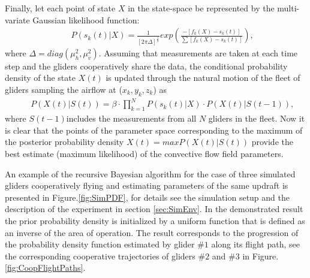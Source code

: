 \documentclass{ifacconf}
\begin{document}
Finally, let each point of state $X$ in the state-space be represented by the multi-variate Gaussian likelihood function:
\begin{eqnarray*}
    && P(s_k(t)\vert X)=\frac{1}{[2\pi \Delta]^\frac{1}{2}}  exp( \frac{-[f_k(X)-s_k(t)]}{\sum [f_k(X)-s_k(t)] }),
    \label{eq:BayesLikeLH}
\end{eqnarray*}
where $\Delta=diag(\mu^2_h,\mu^2_v)$. Assuming that measurements are taken at each time step and the gliders cooperatively share the data, the conditional probability density of the state $X(t)$ is updated through the natural motion of the fleet of gliders sampling the airflow at ($x_k,y_k,z_k$) as
\begin{eqnarray*}
    && P(X(t)\vert S(t))=\beta \cdot \prod_{k=1}^N P(s_k(t) \vert X)\cdot P(X(t) \vert S(t-1)),
    \label{eq:CondProb}
\end{eqnarray*}
where $S(t-1)$includes the measurements from all $N$ gliders in the fleet. Now it is clear that the points of the parameter space corresponding to the maximum of the posterior probability density $X(t)=max P(X(t) \vert S(t))$ provide the best estimate (maximum likelihood) of the convective flow field parameters.


An example of the recursive Bayesian algorithm for the case of three simulated gliders cooperatively flying and estimating parameters of the same updraft is presented in Figure.\ref{fig:SimPDF}, for details see the simulation setup and the description of the experiment in section \ref{sec:SimEnv}. In the demonstrated result the prior probability density is initialized by a uniform function that is defined as an inverse of the area of operation. The result corresponds to the progression of the probability density function estimated by glider $\#1$ along its flight path, see the corresponding cooperative trajectories of gliders $\#2$ and $\#3$ in Figure.\ref{fig:CoopFlightPaths}.
\end{document}
